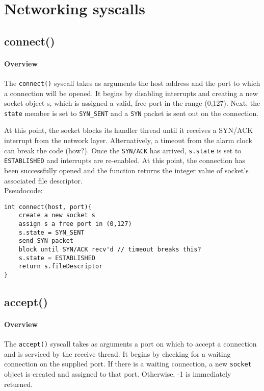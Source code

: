 \documentclass[]{article}
\begin{document}
\section{Networking syscalls}
\subsection{connect()}

\paragraph{Overview}
The \texttt{connect()} syscall takes as arguments the host address and the port to which a connection will be opened. It begins by disabling interrupts and creating a new socket object s, which is assigned a valid, free port in the range (0,127). Next, the \texttt{state} member is set to \texttt{SYN\_SENT} and a \texttt{SYN} packet is sent out on the connection. 

At this point, the socket blocks its handler thread until it receives a SYN/ACK interrupt from the network layer. Alternatively, a timeout from the alarm clock can break the code (how?). Once the \texttt{SYN/ACK} has arrived, \texttt{s.state} is set to \texttt{ESTABLISHED} and interrupts are re-enabled. At this point, the connection has been successfully opened and the function returns the integer value of socket's associated file descriptor. \\


\noindent Pseudocode:

\begin{lstlisting}
int connect(host, port){
	create a new socket s
	assign s a free port in (0,127)
	s.state = SYN_SENT
	send SYN packet
	block until SYN/ACK recv'd // timeout breaks this?
	s.state = ESTABLISHED
	return s.fileDescriptor
}
\end{lstlisting}

\subsection{accept()}
\paragraph{Overview}
The \texttt{accept()} syscall takes as arguments a port on which to accept a connection and is serviced by the receive thread. It begins by checking for a waiting connection on the supplied port. If there is a waiting connection, a new \texttt{socket} object is created and assigned to that port. Otherwise, -1 is immediately returned.
\end{document}
